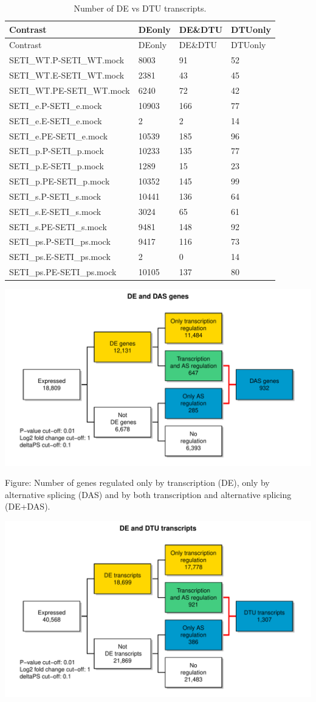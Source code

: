 \documentclass[]{article}
\begin{document}
\begin{longtable}[]{@{}llll@{}}
\caption{Number of DE vs DTU transcripts.}\tabularnewline
\toprule
Contrast & DEonly & DE\&DTU & DTUonly\tabularnewline
\midrule
\endfirsthead
\toprule
Contrast & DEonly & DE\&DTU & DTUonly\tabularnewline
\midrule
\endhead
SETI\_WT.P-SETI\_WT.mock & 8003 & 91 & 52\tabularnewline
SETI\_WT.E-SETI\_WT.mock & 2381 & 43 & 45\tabularnewline
SETI\_WT.PE-SETI\_WT.mock & 6240 & 72 & 42\tabularnewline
SETI\_e.P-SETI\_e.mock & 10903 & 166 & 77\tabularnewline
SETI\_e.E-SETI\_e.mock & 2 & 2 & 14\tabularnewline
SETI\_e.PE-SETI\_e.mock & 10539 & 185 & 96\tabularnewline
SETI\_p.P-SETI\_p.mock & 10233 & 135 & 77\tabularnewline
SETI\_p.E-SETI\_p.mock & 1289 & 15 & 23\tabularnewline
SETI\_p.PE-SETI\_p.mock & 10352 & 145 & 99\tabularnewline
SETI\_s.P-SETI\_s.mock & 10441 & 136 & 64\tabularnewline
SETI\_s.E-SETI\_s.mock & 3024 & 65 & 61\tabularnewline
SETI\_s.PE-SETI\_s.mock & 9481 & 148 & 92\tabularnewline
SETI\_ps.P-SETI\_ps.mock & 9417 & 116 & 73\tabularnewline
SETI\_ps.E-SETI\_ps.mock & 2 & 0 & 14\tabularnewline
SETI\_ps.PE-SETI\_ps.mock & 10105 & 137 & 80\tabularnewline
\bottomrule
\end{longtable}

\includegraphics[width=18.12in]{X2025.01.13.16.34.12.j145/figure/Union set DE genes vs DAS genes}

Figure: Number of genes regulated only by transcription (DE), only by
alternative splicing (DAS) and by both transcription and alternative
splicing (DE+DAS).

\includegraphics[width=18.12in]{X2025.01.13.16.34.12.j145/figure/Union set DE transcripts vs DTU transcripts}
\end{document}
